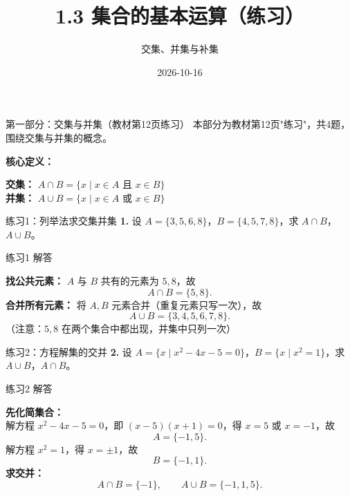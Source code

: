 \documentclass[10pt,aspectratio=169,serif]{beamer}
\title[集合的基本运算练习]{1.3 集合的基本运算（练习）}
\subtitle{交集、并集与补集}
\author{}
\institute{}
\date{2026-10-16}
\begin{document}
\begin{frame}
  \titlepage
\end{frame}

\begin{frame}[t]{第一部分：交集与并集（教材第12页练习）}
本部分为教材第12页"练习"，共4题，围绕\alert{交集}与\alert{并集}的概念。

\vspace{1em}
\textbf{核心定义：}
\begin{tcolorbox}[colback=blue!5,colframe=blue,title=\textbf{交集与并集}]
\textbf{交集：} $A \cap B = \{x \mid x \in A \text{ 且 } x \in B\}$\\[0.3em]
\textbf{并集：} $A \cup B = \{x \mid x \in A \text{ 或 } x \in B\}$
\end{tcolorbox}
\end{frame}

\begin{frame}[t]{练习1：列举法求交集并集}
\textbf{1.} 设 $A = \{3, 5, 6, 8\}$，$B = \{4, 5, 7, 8\}$，求 $A \cap B$，$A \cup B$。
\end{frame}

\begin{frame}[t]{练习1 解答}
\begin{tcolorbox}[colback=orange!10,colframe=orange,title=\textbf{解}]
\textbf{找公共元素：} $A$ 与 $B$ 共有的元素为 $5, 8$，故
\[
A \cap B = \{5, 8\}.
\]
\textbf{合并所有元素：} 将 $A, B$ 元素合并（重复元素只写一次），故
\[
A \cup B = \{3, 4, 5, 6, 7, 8\}.
\]
\vspace{0.5em}
\small（注意：$5, 8$ 在两个集合中都出现，并集中只列一次）
\end{tcolorbox}
\end{frame}

\begin{frame}[t]{练习2：方程解集的交并}
\textbf{2.} 设 $A = \{x \mid x^2 - 4x - 5 = 0\}$，$B = \{x \mid x^2 = 1\}$，求 $A \cup B$，$A \cap B$。
\end{frame}

\begin{frame}[t]{练习2 解答}
\begin{tcolorbox}[colback=orange!10,colframe=orange,title=\textbf{解}]
\textbf{先化简集合：}\\
解方程 $x^2 - 4x - 5 = 0$，即 $(x-5)(x+1)=0$，得 $x = 5$ 或 $x = -1$，故
\[
A = \{-1, 5\}.
\]
解方程 $x^2 = 1$，得 $x = \pm 1$，故
\[
B = \{-1, 1\}.
\]
\textbf{求交并：}
\[
A \cap B = \{-1\},\qquad A \cup B = \{-1, 1, 5\}.
\]
\end{tcolorbox}
\end{frame}
\end{document}
